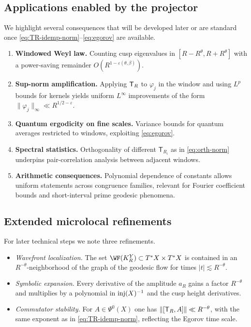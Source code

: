 \subsection{Applications enabled by the projector}\label{subsec:proj-applications}
We highlight several consequences that will be developed later or are standard once \eqref{eq:TR-idemp-norm}–\eqref{eq:egorov} are available.
\begin{enumerate}
\item \textbf{Windowed Weyl law.}
Counting cusp eigenvalues in $[R-R^\theta,R+R^\theta]$ with a power-saving remainder $O(R^{1-\varepsilon(\theta,\beta)})$.
\item \textbf{Sup-norm amplification.}
Applying $\mathsf{T}_R$ to $\varphi_j$ in the window and using $L^p$ bounds for kernels yields uniform $L^\infty$ improvements of the form $\|\varphi_j\|_\infty\ll R^{1/2-\varepsilon}$.
\item \textbf{Quantum ergodicity on fine scales.}
Variance bounds for quantum averages restricted to windows, exploiting \eqref{eq:egorov}.
\item \textbf{Spectral statistics.}
Orthogonality of different $\mathsf{T}_{R_i}$ as in \eqref{eq:orth-norm} underpins pair-correlation analysis between adjacent windows.
\item \textbf{Arithmetic consequences.}
Polynomial dependence of constants allows uniform statements across congruence families, relevant for Fourier coefficient bounds and short-interval prime geodesic phenomena.
\end{enumerate}

\subsection{Extended microlocal refinements}\label{subsec:proj-refinements}
For later technical steps we note three refinements.
\begin{itemize}
\item \emph{Wavefront localization.}
The set $\WF(K_R^Y)\subset T^*X\times T^*X$ is contained in an $R^{-\theta}$-neighborhood of the graph of the geodesic flow for times $|t|\lesssim R^{-\theta}$.
\item \emph{Symbolic expansion.}
Every derivative of the amplitude $a_R$ gains a factor $R^{-\theta}$ and multiplies by a polynomial in $\mathrm{inj}(X)^{-1}$ and the cusp height derivatives.
\item \emph{Commutator stability.}
For $A\in\Psi^0(X)$ one has $\|[\mathsf{T}_R,A]\|\ll R^{-\theta}$, with the same exponent as in \eqref{eq:TR-idemp-norm}, reflecting the Egorov time scale.
\end{itemize}

